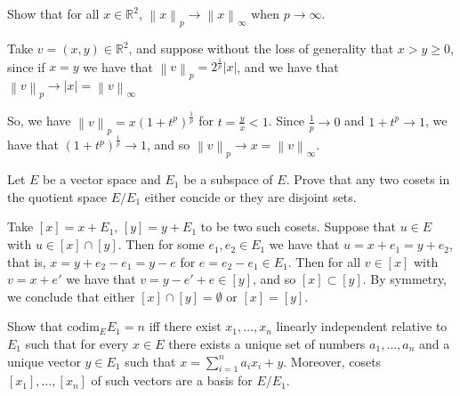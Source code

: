\documentclass[11pt]{article} %
\newcommand{\norm}[1]{\left\lVert#1\right\rVert}
\begin{document}
\begin{Exercise}
Show that for all $x \in \mathbb{R}^2$, $\norm{x}_p \to \norm{x}_{\infty}$ when $p \to \infty$.
\end{Exercise}

\begin{Answer}
Take $v = \left( x, y\right) \in \mathbb{R}^2$, and suppose without the loss of generality that $x > y \geq 0$, since if $x = y$ we have that $\norm{v}_p = 2^{\frac{1}{p}} \left| x \right|$, and we have that $\norm{v}_p \to \left| x \right| =\norm{v}_{\infty}$

So, we have $\norm{v}_p = x\left( 1 + t^p \right)^{\frac{1}{p}}$ for $t = \frac{y}{x} < 1$. Since $\frac{1}{p} \to 0$ and $1 + t^p \to 1$, we have that $\left(1 + t^p\right)^\frac{1}{p} \to 1$, and so $\norm{v}_p \to x = \norm{v}_{\infty}$.
\end{Answer}

\begin{Exercise}
Let $E$ be a vector space and $E_1$ be a subspace of $E$. Prove that any two cosets in the quotient space $E/E_1$ either concide or they are disjoint sets.
\end{Exercise}

\begin{Answer}
Take $\left[x\right] = x + E_1$, $\left[y\right] = y + E_1$ to be two such cosets. Suppose that $u \in E$ with $u \in \left[x\right] \cap \left[y\right]$. Then for some $e_1, e_2 \in E_1$ we have that $u = x + e_1 = y + e_2$, that is, $x = y + e_2 - e_1 = y - e$ for $e = e_2 - e_1 \in E_1$. Then for all $v \in \left[ x \right]$ with $v = x + e'$ we have that $v = y - e' + e \in \left[y\right]$, and so $\left[x\right] \subset \left[y\right]$. By symmetry, we conclude that either $\left[x\right] \cap \left[y\right] = \emptyset$ or $\left[x\right] = \left[y\right]$.
\end{Answer}

\begin{Exercise}
Show that $\text{codim}_{E}E_1 = n$ iff there exist $x_1, \dots, x_n$ linearly independent relative to $E_1$ such that for every $x \in E$ there exists a unique set of numbers $a_1, \dots, a_n$ and a unique vector $y \in E_1$ such that $x = \sum_{i = 1}^{n}a_{i}x_{i} + y$. Moreover, cosets $\left[ x_1 \right], \dots, \left[ x_n \right]$ of such vectors are a basis for $E/E_1$.
\end{Exercise}
\end{document}
